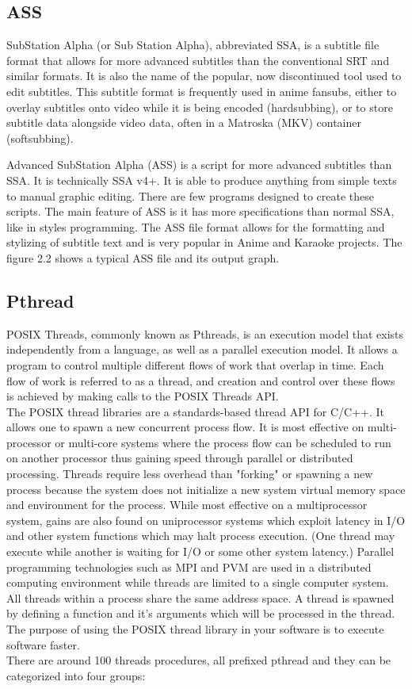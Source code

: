\documentclass[10pt,twocolumn,letterpaper]{article}
\numberwithin{figure}{section}
\begin{document}
\subsection{ASS}

SubStation Alpha (or Sub Station Alpha), abbreviated SSA, is a subtitle file format that allows for more advanced subtitles than the conventional SRT and similar formats. It is also the name of the popular, now discontinued tool used to edit subtitles.
This subtitle format is frequently used in anime fansubs, either to overlay subtitles onto video while it is being encoded (hardsubbing), or to store subtitle data alongside video data, often in a Matroska (MKV) container (softsubbing). 

Advanced SubStation Alpha (ASS) is a script for more advanced subtitles than SSA. It is technically SSA v4+. It is able to produce anything from simple texts to manual graphic editing. There are few programs designed to create these scripts. The main feature of ASS is it has more specifications than normal SSA, like in styles programming. 
The ASS file format allows for the formatting and stylizing of subtitle text and is very popular in Anime and Karaoke projects.
The figure 2.2 shows a typical ASS file and its output graph.


\subsection{Pthread}

POSIX Threads, commonly known as Pthreads, is an execution model that exists independently from a language, as well as a parallel execution model. It allows a program to control multiple different flows of work that overlap in time. Each flow of work is referred to as a thread, and creation and control over these flows is achieved by making calls to the POSIX Threads API.\\
The POSIX thread libraries are a standards-based thread API for C/C++. It allows one to spawn a new concurrent process flow. It is most effective on multi-processor or multi-core systems where the process flow can be scheduled to run on another processor thus gaining speed through parallel or distributed processing. Threads require less overhead than "forking" or spawning a new process because the system does not initialize a new system virtual memory space and environment for the process. While most effective on a multiprocessor system, gains are also found on uniprocessor systems which exploit latency in I/O and other system functions which may halt process execution. (One thread may execute while another is waiting for I/O or some other system latency.) Parallel programming technologies such as MPI and PVM are used in a distributed computing environment while threads are limited to a single computer system. All threads within a process share the same address space. A thread is spawned by defining a function and it's arguments which will be processed in the thread. The purpose of using the POSIX thread library in your software is to execute software faster.\\
There are around 100 threads procedures, all prefixed pthread and they can be categorized into four groups:
\end{document}

